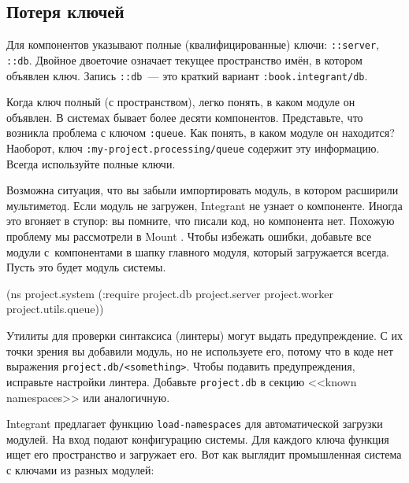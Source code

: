 \fi

\subsection{Потеря ключей}


Для компонентов указывают полные (квалифицированные) ключи: \verb|::server|,
\verb|::db|. Двойное двоеточие означает текущее пространство имён, в котором
объявлен ключ. Запись \verb|::db|~--- это краткий вариант
\verb|:book.integrant/db|.

Когда ключ полный (с пространством), легко понять, в каком модуле он объявлен. В
системах бывает более десяти компонентов. Представьте, что возникла проблема с
ключом \verb|:queue|. Как понять, в каком модуле он находится?  Наоборот, ключ
\verb|:my-project.processing/queue| содержит эту информацию. Всегда используйте
полные ключи.

Возможна ситуация, что вы забыли импортировать модуль, в котором расширили
мультиметод. Если модуль не загружен, Integrant не узнает о компоненте. Иногда
это вгоняет в ступор: вы помните, что писали код, но компонента нет. Похожую
проблему мы рассмотрели в Mount . Чтобы избежать ошибки,
добавьте все модули с~компонентами в шапку главного модуля, который загружается
всегда. Пусть это будет модуль системы.

\begin{english}
  \begin{clojure}
(ns project.system
  (:require project.db
            project.server
            project.worker
            project.utils.queue))
  \end{clojure}
\end{english}

Утилиты для проверки синтаксиса (линтеры) могут выдать предупреждение. С их
точки зрения вы добавили модуль, но не используете его, потому что в коде нет
выражения \verb|project.db/<something>|. Чтобы подавить предупреждения,
исправьте настройки линтера. Добавьте \verb|project.db| в секцию <<known
namespaces>> или аналогичную.


\mnoindent
Integrant предлагает функцию \verb|load-namespaces| для автоматической загрузки
модулей. На вход подают конфигурацию системы. Для каждого ключа функция ищет его
пространство и загружает его. Вот как выглядит промышленная система с ключами из
разных модулей:

